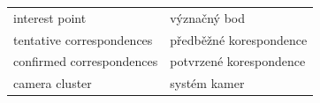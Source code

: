 \documentclass[11pt,oneside,a4paper,pdftex]{article}   %
\begin{document}
	\bigskip

	\begin{tabular*}{1\paperwidth}{p{}p{}}
		interest point				& význačný bod				\\
		tentative correspondences	& předběžné korespondence	\\
		confirmed correspondences	& potvrzené korespondence	\\
		camera cluster				& systém kamer				\\
	\end{tabular*}
	





%
%
\printbibliography
%
\end{document}
